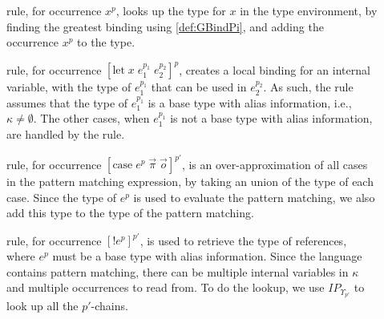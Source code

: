 \documentclass{llncs}
\begin{document}
\begin{description}

	\item[] rule, for occurrence $x^p$, looks up the type for $x$ in the type environment, by finding the greatest binding using \cref{def:GBindPi}, and adding the occurrence $x^p$ to the type.

	\item[] rule, for occurrence $[\mbox{let}\;x\;e_1^{p_1}\;e_2^{p_2}]^p$, creates a local binding for an internal variable, with the type of $e_1^{p_1}$ that can be used in $e_2^{p_2}$.
     As such, the rule assumes that the type of $e_1^{p_1}$ is a base type with alias information, i.e., $\kappa\neq\emptyset$.
		The other cases, when $e_1^{p_1}$ is not a base type with alias information, are handled by the  rule.

	\item[] rule, for occurrence $[\mbox{case}\;e^{p}\;\vec{\pi}\;\vec{o}]^{p'}$, is an over-approximation of all cases in the pattern matching expression, by taking an union of the type of each case.
		Since the type of $e^p$ is used to evaluate the pattern matching, we also add this type to the type of the pattern matching.

	\item[] rule, for occurrence $[!e^{p}]^{p'}$, is used to retrieve the type of references, where $e^p$ must be a base type with alias information.
     Since the language contains pattern matching, there can be multiple internal variables in $\kappa$ and multiple occurrences to read from.
     To do the lookup, we use $IP_{\Upsilon_{p'}}$ to look up all the $p'$-chains.
\end{description}
\end{document}
